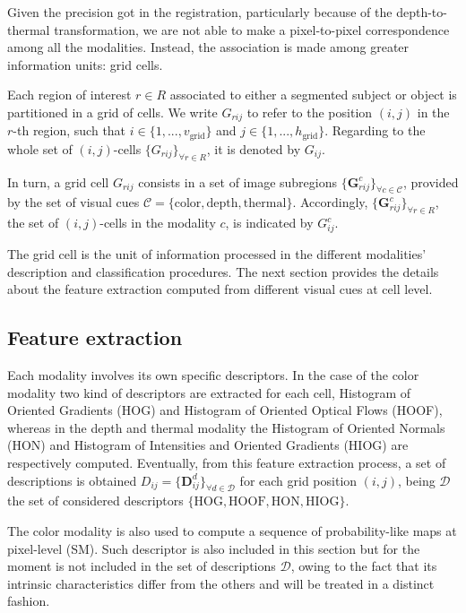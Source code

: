 \documentclass[10pt,twocolumn,letterpaper]{article}
\begin{document}
Given the precision got in the registration, particularly because of the depth-to-thermal transformation, we are not able to make a pixel-to-pixel correspondence among all the modalities. Instead, the association is made among greater information units: grid cells. 

Each region of interest $r \in R$ associated to either a segmented subject or object is partitioned in a grid of cells. We write $G_{rij}$ to refer to the position $(i,j)$ in the $r$-th region, such that $i \in \{ 1,...,v_\mathrm{grid} \}$ and $j \in \{ 1,...,h_\mathrm{grid} \}$. Regarding to the whole set of $(i,j)$-cells $\{G_{rij}\}_{\forall r \in R}$, it is denoted by $G_{ij}$.

In turn, a grid cell $G_{rij}$ consists in a set of image subregions $\{\mathbf{G}_{rij}^c\}_{\forall{c} \in \mathcal{C}}$, provided by the set of visual cues $\mathcal{C} = \{\mathrm{color}, \mathrm{depth}, \mathrm{thermal}\}$. Accordingly, $\{\mathbf{G}_{rij}^c\}_{\forall r \in R}$, the set of $(i,j)$-cells in the modality $c$, is indicated by $G_{ij}^c$.

The grid cell is the unit of information processed in the different modalities' description and classification procedures. The next section provides the details about the feature extraction computed from different visual cues at cell level.

\subsection{Feature extraction}
\label{ssec:feature extraction}

Each modality involves its own specific descriptors. In the case of the color modality two kind of descriptors are extracted for each cell, Histogram of Oriented Gradients (HOG) and Histogram of Oriented Optical Flows (HOOF), whereas in the depth and thermal modality the Histogram of Oriented Normals (HON) and Histogram of Intensities and Oriented Gradients (HIOG) are respectively computed. Eventually, from this feature extraction process, a set of descriptions is obtained $D_{ij} = \{\mathbf{D}_{ij}^d\}_{\forall d \in \mathcal{D}}$ for each grid position $(i,j)$, being $\mathcal{D}$ the set of considered descriptors $\{\mathrm{HOG}, \mathrm{HOOF}, \mathrm{HON}, \mathrm{HIOG}\}$.

The color modality is also used to compute a sequence of probability-like maps at pixel-level (SM). Such descriptor is also included in this section but for the moment is not included in the set of descriptions $\mathcal{D}$, owing to the fact that its intrinsic characteristics differ from the others and will be treated in a distinct fashion.
\end{document}
